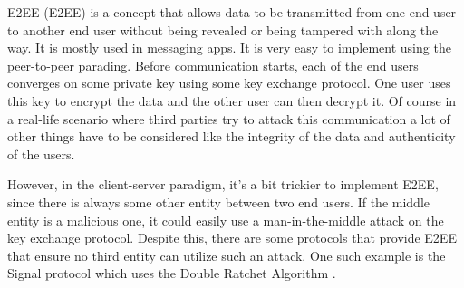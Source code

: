 E2EE (\acl{E2EE}) is a concept that allows data to be transmitted from one end user to another end user without being revealed or being tampered with along the way. It is mostly used in messaging apps. It is very easy to implement using the peer-to-peer parading. Before communication starts, each of the end users converges on some private key using some key exchange protocol. One user uses this key to encrypt the data and the other user can then decrypt it. Of course in a real-life scenario where third parties try to attack this communication a lot of other things have to be considered like the integrity of the data and authenticity of the users.

However, in the client-server paradigm, it's a bit trickier to implement E2EE, since there is always some other entity between two end users. If the middle entity is a malicious one, it could easily use a man-in-the-middle attack on the key exchange protocol. Despite this, there are some protocols that provide E2EE that ensure no third entity can utilize such an attack. One such example is the Signal protocol which uses the Double Ratchet Algorithm \cite{Marlinspike2016}.
